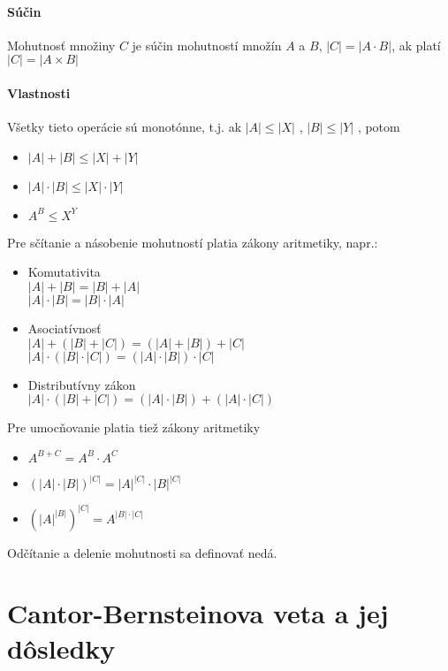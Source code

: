    \paragraph{Súčin}
   Mohutnosť množiny $C$ je súčin mohutností množín $A$ a $B$,
   $|C| = |A \cdot B|$, ak platí $|C| = |A \times B|$


   \paragraph{Vlastnosti}

	Všetky tieto operácie  sú monotónne, t.j. ak $|A| \leq |X|$ , $|B| \leq |Y|$ , potom
	\begin{itemize}
	   \item $|A| + |B| \leq |X| + |Y|$
	   \item $|A| \cdot |B| \leq |X| \cdot |Y|$
	   \item $A^{B} \leq X^{Y}$
	\end{itemize}

	Pre sčítanie a násobenie mohutností platia zákony aritmetiky, napr.:

	\begin{itemize} 
		\item Komutativita\\
		$|A| + |B| = |B| + |A|$\\
		$|A| \cdot |B| = |B| \cdot |A|$
	\item Asociatívnosť\\
	$|A| + ( |B| + |C| ) = ( |A| + |B| ) + |C|$\\
	$|A| \cdot ( |B| \cdot |C| ) = ( |A| \cdot |B| ) \cdot |C|$ 
	\item Distributívny zákon\\
	$|A| \cdot ( |B| + |C| ) = ( |A| \cdot |B| ) + ( |A| \cdot |C| )$
	\end{itemize}

	Pre umocňovanie platia tiež zákony aritmetiky

	\begin{itemize}
		\item $A^{B+C} = A^{B} \cdot A^{C}$
		\item $(|A| \cdot |B|)^{|C|} = |A|^{|C|} \cdot |B|^{|C|}$
		\item $(|A|^{|B|})^{|C|} = A^{|B| \cdot |C|}$
	\end{itemize}

Odčítanie a delenie mohutnosti sa definovať nedá.


\section {Cantor-Bernsteinova veta a jej dôsledky}
